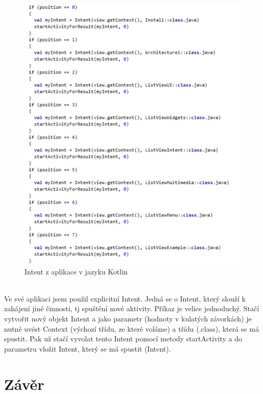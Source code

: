 \documentclass{vskpou} %
\begin{document}
\begin{itemize}
\begin{figure}[h!]
        \includegraphics[scale=0.4]{images/27.jpg}
        \caption{Intent z aplikace v jazyku Kotlin}
        \label{27}
        \end{figure}
  \\
 
  Ve své aplikaci jsem použil explicitní Intent. Jedná se o Intent, který slouží k zahájení jiné činnosti, tj spuštění nové aktivity. Příkaz je velice jednoduchý. Stačí vytvořit nový objekt Intent a jako parametr (hodnoty v kulatých závorkách) je nutné uvést Context (výchozí třídu, ze které voláme) a třídu (.class), která se má spustit. Pak už stačí vyvolat tento Intent pomocí metody startActivity a do parametru vložit Intent, který se má spustit (Intent).
    \end{itemize}







\stranyresume





\section*{Závěr}
\end{document}
